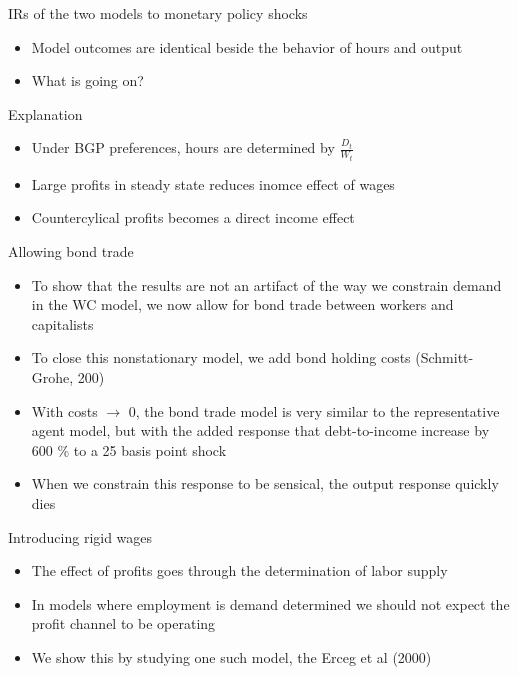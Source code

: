 \documentclass{beamer}
\newcommand{\bit}{\begin{itemize}}
\newcommand{\eit}{\end{itemize}}
\begin{document}
\begin{frame}{IRs of the two models to monetary policy shocks}

\bit
	\item Model outcomes are identical beside the behavior of hours and output
	\item What is going on? 
\eit


\end{frame}


\begin{frame}{Explanation}

\bit
	\item Under BGP preferences, hours are determined by $\frac{D_t}{W_t}$
	\item Large profits in steady state reduces inomce effect of wages
	\item Countercylical profits becomes a direct income effect
\eit


\end{frame}

\begin{frame}{Allowing bond trade}

\bit
	\item To show that the results are not an artifact of the way we constrain demand in the WC model, we now allow for bond trade between workers and capitalists
	\item To close this nonstationary model, we add bond holding costs (Schmitt-Grohe, 200)
	\item With costs $\rightarrow$ 0, the bond trade model is very similar to the representative agent model, but with the added response that debt-to-income increase by 600 \% to a 25 basis point shock
	\item When we constrain this response to be sensical, the output response quickly dies
\eit


\end{frame}



\begin{frame}{Introducing rigid wages}

\bit
	\item The effect of profits goes through the determination of labor supply
	\item In models where employment is demand determined we should not expect the profit channel to be operating
	\item We show this by studying one such model, the Erceg et al (2000)
\eit


\end{frame}
\end{document}
